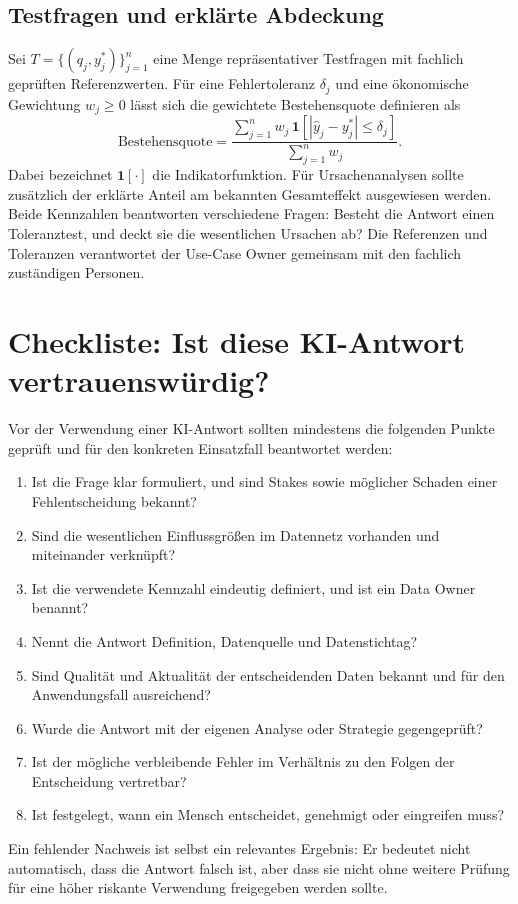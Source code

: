 \documentclass[a4paper,12pt,twoside]{report}
\theoremstyle{definition}
\begin{document}
\section{Testfragen und erklärte Abdeckung}
Sei $T=\{(q_j,y_j^*)\}_{j=1}^n$ eine Menge repräsentativer Testfragen mit fachlich geprüften Referenzwerten. Für eine Fehlertoleranz $\delta_j$ und eine ökonomische Gewichtung $w_j\geq 0$ lässt sich die gewichtete Bestehensquote definieren als
\[
\mathrm{Bestehensquote}
=\frac{\sum_{j=1}^n w_j\,\mathbf{1}\!\left[|\hat y_j-y_j^*|\leq\delta_j\right]}
{\sum_{j=1}^n w_j}.
\]
Dabei bezeichnet $\mathbf{1}[\cdot]$ die Indikatorfunktion. Für Ursachenanalysen sollte zusätzlich der erklärte Anteil am bekannten Gesamteffekt ausgewiesen werden. Beide Kennzahlen beantworten verschiedene Fragen: Besteht die Antwort einen Toleranztest, und deckt sie die wesentlichen Ursachen ab? Die Referenzen und Toleranzen verantwortet der Use-Case Owner gemeinsam mit den fachlich zuständigen Personen.

\chapter{Checkliste: Ist diese KI-Antwort vertrauens\-würdig?}
\label{sec:checklist}

Vor der Verwendung einer KI-Antwort sollten mindestens die folgenden Punkte geprüft und für den konkreten Einsatzfall beantwortet werden:
\begin{enumerate}[label=$\square$]
\item Ist die Frage klar formuliert, und sind Stakes sowie möglicher Schaden einer Fehlentscheidung bekannt?
\item Sind die wesentlichen Einflussgrößen im Datennetz vorhanden und miteinander verknüpft?
\item Ist die verwendete Kennzahl eindeutig definiert, und ist ein Data Owner benannt?
\item Nennt die Antwort Definition, Datenquelle und Datenstichtag?
\item Sind Qualität und Aktualität der entscheidenden Daten bekannt und für den Anwendungsfall ausreichend?
\item Wurde die Antwort mit der eigenen Analyse oder Strategie gegengeprüft?
\item Ist der mögliche verbleibende Fehler im Verhältnis zu den Folgen der Entscheidung vertretbar?
\item Ist festgelegt, wann ein Mensch entscheidet, genehmigt oder eingreifen muss?
\end{enumerate}
Ein fehlender Nachweis ist selbst ein relevantes Ergebnis: Er bedeutet nicht automatisch, dass die Antwort falsch ist, aber dass sie nicht ohne weitere Prüfung für eine höher riskante Verwendung freigegeben werden sollte.
\end{document}
